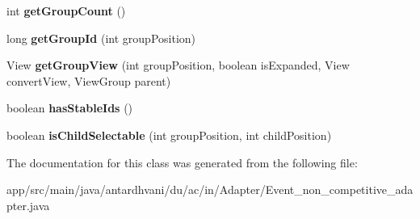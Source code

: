 \begin{DoxyCompactItemize}
\item 
\hypertarget{classantardhvani_1_1du_1_1ac_1_1in_1_1_adapter_1_1_event__non__competitive__adapter_a5626881e41bafae4e6618a01cee35d67}{}int {\bfseries get\+Group\+Count} ()\label{classantardhvani_1_1du_1_1ac_1_1in_1_1_adapter_1_1_event__non__competitive__adapter_a5626881e41bafae4e6618a01cee35d67}

\item 
\hypertarget{classantardhvani_1_1du_1_1ac_1_1in_1_1_adapter_1_1_event__non__competitive__adapter_a55ba6bed4f23c6653c92e2254784f9f7}{}long {\bfseries get\+Group\+Id} (int group\+Position)\label{classantardhvani_1_1du_1_1ac_1_1in_1_1_adapter_1_1_event__non__competitive__adapter_a55ba6bed4f23c6653c92e2254784f9f7}

\item 
\hypertarget{classantardhvani_1_1du_1_1ac_1_1in_1_1_adapter_1_1_event__non__competitive__adapter_a125b3c65366f960b19b9a4dcc36abd8f}{}View {\bfseries get\+Group\+View} (int group\+Position, boolean is\+Expanded, View convert\+View, View\+Group parent)\label{classantardhvani_1_1du_1_1ac_1_1in_1_1_adapter_1_1_event__non__competitive__adapter_a125b3c65366f960b19b9a4dcc36abd8f}

\item 
\hypertarget{classantardhvani_1_1du_1_1ac_1_1in_1_1_adapter_1_1_event__non__competitive__adapter_a16d977a681385290ba937a46ae4ebb45}{}boolean {\bfseries has\+Stable\+Ids} ()\label{classantardhvani_1_1du_1_1ac_1_1in_1_1_adapter_1_1_event__non__competitive__adapter_a16d977a681385290ba937a46ae4ebb45}

\item 
\hypertarget{classantardhvani_1_1du_1_1ac_1_1in_1_1_adapter_1_1_event__non__competitive__adapter_a88d7eb108541f42f1017882e46043130}{}boolean {\bfseries is\+Child\+Selectable} (int group\+Position, int child\+Position)\label{classantardhvani_1_1du_1_1ac_1_1in_1_1_adapter_1_1_event__non__competitive__adapter_a88d7eb108541f42f1017882e46043130}

\end{DoxyCompactItemize}


The documentation for this class was generated from the following file\+:\begin{DoxyCompactItemize}
\item 
app/src/main/java/antardhvani/du/ac/in/\+Adapter/Event\+\_\+non\+\_\+competitive\+\_\+adapter.\+java\end{DoxyCompactItemize}

